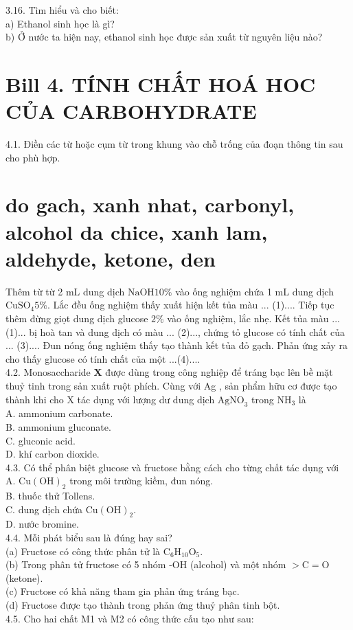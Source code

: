 \documentclass[10pt]{article}
\begin{document}
3.16. Tìm hiểu và cho biết:\\
a) Ethanol sinh học là gì?\\
b) Ở nước ta hiện nay, ethanol sinh học được sản xuất từ nguyên liệu nào?

\section*{Bill 4. TÍNH CHẤT HOÁ HOC CỦA CARBOHYDRATE}
4.1. Điền các từ hoặc cụm từ trong khung vào chỗ trống của đoạn thông tin sau cho phù hợp.

\section*{do gach, xanh nhat, carbonyl, alcohol da chice, xanh lam, aldehyde, ketone, den}
Thêm từ từ 2 mL dung dịch $\mathrm{NaOH} 10 \%$ vào ống nghiệm chứa 1 mL dung dịch $\mathrm{CuSO}_{4} 5 \%$. Lắc đều ống nghiệm thấy xuất hiện kết tủa màu ... (1).... Tiếp tục thêm đừng giọt dung dịch glucose $2 \%$ vào ống nghiệm, lắc nhẹ. Kết tủa màu ... (1)... bị hoà tan và dung dịch có màu ... (2)..., chứng tỏ glucose có tính chất của ... (3).... Đun nóng ống nghiệm thấy tạo thành kết tủa đỏ gạch. Phản ứng xảy ra cho thấy glucose có tính chất của một ...(4)....\\
4.2. Monosaccharide $\mathbf{X}$ được dùng trong công nghiệp để tráng bạc lên bề mặt thuỷ tinh trong sản xuất ruột phích. Cùng với Ag , sản phẩm hữu cơ được tạo thành khi cho X tác dụng với lượng dư dung dịch $\mathrm{AgNO}_{3}$ trong $\mathrm{NH}_{3}$ là\\
A. ammonium carbonate.\\
B. ammonium gluconate.\\
C. gluconic acid.\\
D. khí carbon dioxide.\\
4.3. Có thể phân biệt glucose và fructose bằng cách cho từng chất tác dụng với\\
A. $\mathrm{Cu}(\mathrm{OH})_{2}$ trong môi trường kiềm, đun nóng.\\
B. thuốc thử Tollens.\\
C. dung dịch chứa $\mathrm{Cu}(\mathrm{OH})_{2}$.\\
D. nước bromine.\\
4.4. Mỗi phát biểu sau là đúng hay sai?\\
(a) Fructose có công thức phân tử là $\mathrm{C}_{6} \mathrm{H}_{10} \mathrm{O}_{5}$.\\
(b) Trong phân tử fructose có 5 nhóm -OH (alcohol) và một nhóm $>\mathrm{C}=\mathrm{O}$ (ketone).\\
(c) Fructose có khả năng tham gia phản ứng tráng bạc.\\
(d) Fructose được tạo thành trong phản ứng thuỷ phân tinh bột.\\
4.5. Cho hai chất M1 và M2 có công thức cấu tạo như sau:
\end{document}
